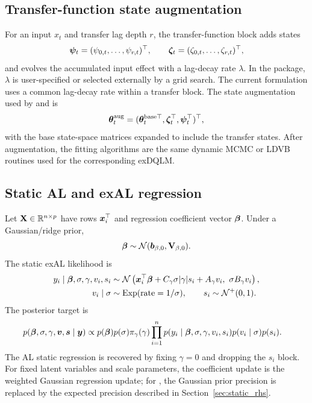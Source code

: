 \subsection{Transfer-function state augmentation}
\label{sec:transfer_function}

For an input $x_t$ and transfer lag depth $r$, the transfer-function block
adds states
\[
\boldsymbol{\psi}_t=(\psi_{0,t},\ldots,\psi_{r,t})^\top,\qquad
\boldsymbol{\zeta}_t=(\zeta_{0,t},\ldots,\zeta_{r,t})^\top,
\]
and evolves the accumulated input effect with a lag-decay rate $\lambda$.
In the package, $\lambda$ is user-specified or selected externally by a grid
search. The current formulation uses a common lag-decay rate within a
transfer block. The state augmentation used by
 and  is
\begin{equation}
\boldsymbol{\theta}^{\mathrm{aug}}_t
=
(\boldsymbol{\theta}^{\mathrm{base}\top}_t,
\boldsymbol{\zeta}^{\top}_t,\boldsymbol{\psi}^{\top}_t)^\top,
\label{eq:tf_aug_state}
\end{equation}
with the base state-space matrices expanded to include the transfer states.
After augmentation, the fitting algorithms are the same dynamic MCMC or LDVB
routines used for the corresponding exDQLM.

\subsection{Static AL and exAL regression}
\label{sec:static_ridge}

Let $\mathbf{X}\in\mathbb{R}^{n\times p}$ have rows $\boldsymbol{x}_i^\top$ and regression
coefficient vector $\boldsymbol{\beta}$. Under a Gaussian/ridge prior,
\begin{equation}
\boldsymbol{\beta}\sim\mathcal{N}(\boldsymbol{b}_{\beta,0},\mathbf{V}_{\beta,0}).
\label{eq:static_beta_ridge}
\end{equation}
The static exAL likelihood is
\begin{align}
y_i\mid\boldsymbol{\beta},\sigma,\gamma,v_i,s_i
&\sim
\mathcal{N}\left(
\boldsymbol{x}_i^\top\boldsymbol{\beta}
+C_\gamma\sigma|\gamma|s_i+A_\gamma v_i,\
\sigma B_\gamma v_i
\right),\\
v_i\mid\sigma&\sim \operatorname{Exp}(\text{rate}=1/\sigma),\qquad
s_i\sim\mathcal{N}^{+}(0,1).
\label{eq:static_exal_hierarchy}
\end{align}
The posterior target is
\begin{align}
p(\boldsymbol{\beta},\sigma,\gamma,\boldsymbol{v},\boldsymbol{s}\mid\boldsymbol{y})
&\propto
p(\boldsymbol{\beta})p(\sigma)\pi_\gamma(\gamma)
\prod_{i=1}^n
p(y_i\mid\boldsymbol{\beta},\sigma,\gamma,v_i,s_i)
p(v_i\mid\sigma)p(s_i).
\label{eq:static_exal_target}
\end{align}
The AL static regression is recovered by fixing $\gamma=0$ and dropping the
$s_i$ block. For fixed latent variables and scale parameters, the
coefficient update is the weighted Gaussian regression update; for
\code{beta_prior = "rhs\_ns"}, the Gaussian prior precision is replaced by
the expected \code{rhs\_ns} precision described in
Section~\ref{sec:static_rhs}.

